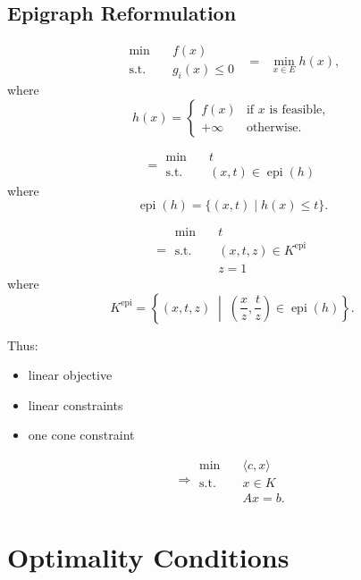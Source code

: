 \documentclass[12pt,oneside]{book}
\numberwithin{equation}{section}
\theoremstyle{definition}
\theoremstyle{plain}
\theoremstyle{remark}
\begin{document}
\subsection*{Epigraph Reformulation}

\[
\begin{aligned}
\min \quad & f(x) \\
\text{s.t.} \quad & g_i(x) \le 0
\end{aligned}
\;\;=\;\;
\min_{x \in E} h(x),
\]
where
\[
h(x) =
\begin{cases}
f(x) & \text{if } x \text{ is feasible}, \\
+\infty & \text{otherwise}.
\end{cases}
\]

\medskip

\[
=
\begin{aligned}
\min \quad & t \\
\text{s.t.} \quad & (x,t) \in \operatorname{epi}(h)
\end{aligned}
\]
where
\[
\operatorname{epi}(h) = \{ (x,t) \mid h(x) \le t \}.
\]

\medskip

\[
=
\begin{aligned}
\min \quad & t \\
\text{s.t.} \quad & (x,t,z) \in K^{\mathrm{epi}} \\
& z = 1
\end{aligned}
\]
where
\[
K^{\mathrm{epi}} = \left\{ (x,t,z) \;\middle|\; \left(\frac{x}{z}, \frac{t}{z}\right) \in \operatorname{epi}(h) \right\}.
\]

\medskip

Thus:
\begin{itemize}
\item linear objective
\item linear constraints
\item one cone constraint
\end{itemize}

\[
\Longrightarrow
\begin{aligned}
\min \quad & \langle c, x \rangle \\
\text{s.t.} \quad & x \in K \\
& Ax = b.
\end{aligned}
\]

\section{Optimality Conditions}
\end{document}
